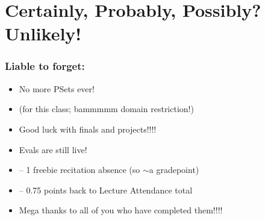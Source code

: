 ﻿%





\setcounter{section}{10} 

\section{Certainly, Probably, Possibly? Unlikely!}

\begin{frame}

\scriptsize{\tableofcontents}

\end{frame}



\begin{frame}
\frametitle{Liable to forget:}

\begin{itemize}[<+->]

\item No more PSets ever! 
\item[] (for this class; bammmmm domain restriction!)

\item Good luck with finals and projects!!!! 


\item Evals are still live! 


\item[] -- 1 freebie recitation absence (so $\sim$a gradepoint)

\item[] -- 0.75 points back to Lecture Attendance total

\item Mega thanks to all of you who have completed them!!!! 


\end{itemize}
\end{frame}

